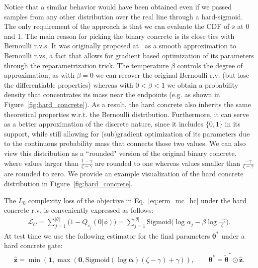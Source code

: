 \documentclass{article} %
\def\!#1{\boldsymbol{#1}}
\def\*#1{\mathbf{#1}}
\begin{document}
Notice that a similar behavior would have been obtained even if we passed samples from any other distribution over the real line through a hard-sigmoid. The only requirement of the approach is that we can evaluate the CDF of $\bar{s}$ at 0 and 1. The main reason for picking the binary concrete is its close ties with Bernoulli r.v.s. It was originally proposed at~\cite{maddison2016concrete,jang2016categorical} as a smooth approximation to Bernoulli r.vs, a fact that allows for gradient based optimization of its parameters through the reparametrization trick. The temperature $\beta$ controls the degree of approximation, as with $\beta = 0$ we can recover the original Bernoulli r.v. (but lose the differentiable properties) whereas with $ 0 < \beta < 1$ we obtain a probability density that concentrates its mass near the endpoints (e.g. as shown in Figure~\ref{fig:hard_concrete}). 
As a result, the hard concrete also inherits the same theoretical properties w.r.t. the Bernoulli distribution. Furthermore, it can serve as a better approximation of the discrete nature, since it includes $\{0, 1\}$ in its support, while still allowing for (sub)gradient optimization of its parameters due to the continuous probability mass that connects those two values. We can also view this distribution as a ``rounded" version of the original binary concrete, where values larger than $\frac{1 - \gamma}{\zeta - \gamma}$ are rounded to one whereas values smaller than $\frac{- \gamma}{\zeta - \gamma}$ are rounded to zero. We provide an example visualization of the hard concrete distribution in Figure~\ref{fig:hard_concrete}. 

The $L_0$ complexity loss of the objective in Eq.~\ref{eq:erm_mc_hc} under the hard concrete r.v. is conveniently expressed as follows: 
\begin{align}
    \mathcal{L}_C = \sum_{j=1}^{|\theta|} \big(1 - Q_{\bar{s}_j}(0|\phi)\big) = \sum_{j=1}^{|\theta|}\text{Sigmoid}\big(\log\alpha_j - \beta\log\frac{-\gamma}{\zeta}\big).
\end{align}
At test time we use the following estimator for the final parameters $\!\theta^*$ under a hard concrete gate:
\begin{align}
	\hat{\*z} = \min(\*1, \max(\*0, \text{Sigmoid}(\log\!\alpha)(\zeta - \gamma) + \gamma)), \qquad
	\!\theta^* = \tilde{\!\theta}^* \odot \hat{\*z}\label{eq:fn_theta}.
\end{align}
\end{document}
